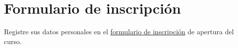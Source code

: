 \section*{Formulario de inscripción}

Registre sus datos personales en el
\href{https://docs.google.com/document/d/1t8QjnHjA6Dj1atmErGQ_0C71qGGAhu_u4OMdjG1XPm0}{formulario de inscripción} de
apertura del curso.
\begin{figure}[ht!]
	\centering
	\href{https://docs.google.com/document/d/1t8QjnHjA6Dj1atmErGQ_0C71qGGAhu_u4OMdjG1XPm0}{
		}
\end{figure}
